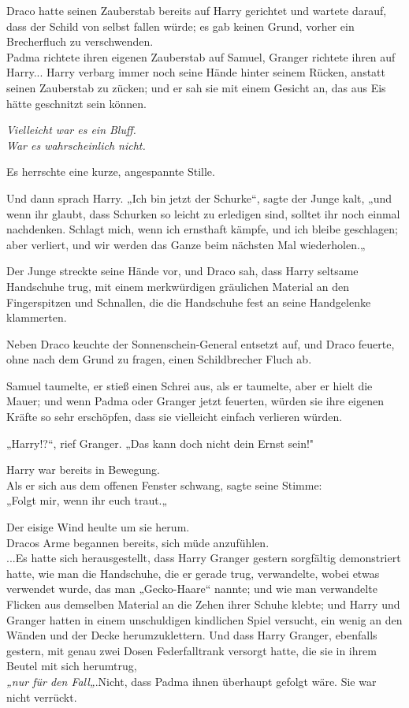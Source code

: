 {Draco hatte seinen Zauberstab bereits auf Harry gerichtet und wartete darauf, dass der Schild von selbst fallen würde; es gab keinen Grund, vorher ein Brecherfluch zu verschwenden.\\ Padma richtete ihren eigenen Zauberstab auf Samuel, Granger richtete ihren auf Harry... Harry verbarg immer noch seine Hände hinter seinem Rücken, anstatt seinen Zauberstab zu zücken; und er sah sie mit einem Gesicht an, das aus Eis hätte geschnitzt sein können.

\emph{Vielleicht war es ein Bluff.}\\ \emph{War es wahrscheinlich nicht.}

Es herrschte eine kurze, angespannte Stille.

Und dann sprach Harry. „Ich bin jetzt der Schurke“, sagte der Junge kalt, „und wenn ihr glaubt, dass Schurken so leicht zu erledigen sind, solltet ihr noch einmal nachdenken. Schlagt mich, wenn ich ernsthaft kämpfe, und ich bleibe geschlagen; aber verliert, und wir werden das Ganze beim nächsten Mal wiederholen.„

Der Junge streckte seine Hände vor, und Draco sah, dass Harry seltsame Handschuhe trug, mit einem merkwürdigen gräulichen Material an den Fingerspitzen und Schnallen, die die Handschuhe fest an seine Handgelenke klammerten.

Neben Draco keuchte der Sonnenschein-General entsetzt auf, und Draco feuerte, ohne nach dem Grund zu fragen, einen Schildbrecher Fluch ab.

Samuel taumelte, er stieß einen Schrei aus, als er taumelte, aber er hielt die Mauer; und wenn Padma oder Granger jetzt feuerten, würden sie ihre eigenen Kräfte so sehr erschöpfen, dass sie vielleicht einfach verlieren würden.

„Harry!?“, rief Granger. „Das kann doch nicht dein Ernst sein!"

Harry war bereits in Bewegung.\\ Als er sich aus dem offenen Fenster schwang, sagte seine Stimme:\\ „Folgt mir, wenn ihr euch traut.„

Der eisige Wind heulte um sie herum.\\ Dracos Arme begannen bereits, sich müde anzufühlen.\\ ...Es hatte sich herausgestellt, dass Harry Granger gestern sorgfältig demonstriert hatte, wie man die Handschuhe, die er gerade trug, verwandelte, wobei etwas verwendet wurde, das man „Gecko-Haare“ nannte; und wie man verwandelte Flicken aus demselben Material an die Zehen ihrer Schuhe klebte; und Harry und Granger hatten in einem unschuldigen kindlichen Spiel versucht, ein wenig an den Wänden und der Decke herumzuklettern. Und dass Harry Granger, ebenfalls gestern, mit genau zwei Dosen Federfalltrank versorgt hatte, die sie in ihrem Beutel mit sich herumtrug,\\ \emph{„nur für den Fall„}.Nicht, dass Padma ihnen überhaupt gefolgt wäre. Sie war nicht verrückt.

}
